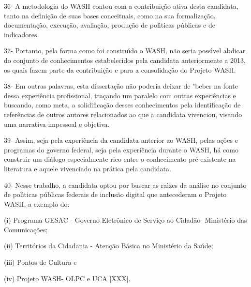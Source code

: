 \documentclass[
12pt,		%
openright,	%
twoside,  %
a4paper,			%
chapter=TITLE,		%
english,			%
french,				%
spanish,			%
brazil				%
]{USPSC-classe/USPSC}
\begin{document}
36- A metodologia do WASH contou com a contribui\c{c}\~ao ativa desta candidata, tanto na defini\c{c}\~ao de suas bases conceituais, como na sua formaliza\c{c}\~ao, documenta\c{c}\~ao, execu\c{c}\~ao,  avalia\c{c}\~ao, produ\c{c}\~ao de pol\'{\i}ticas p\'ublicas e de  indicadores.




37- Portanto, pela forma como foi constru\'{\i}do o WASH, n\~ao seria poss\'{\i}vel abdicar do conjunto de conhecimentos estabelecidos pela candidata anteriormente a 2013, os quais fazem parte da contribui\c{c}\~ao e  para a consolida\c{c}\~ao do Projeto WASH.  




38- Em outras palavras, esta disserta\c{c}\~ao n\~ao poderia deixar de "beber na fonte dessa experi\^encia profissional, tra\c{c}ando um paralelo com outras experi\^encias e buscando, como meta, a solidifica\c{c}\~ao desses conhecimentos pela identifica\c{c}\~ao de refer\^encias de outros autores relacionados ao que a candidata vivenciou, visando uma narrativa impessoal e objetiva.




39- Assim, seja pela experi\^encia da candidata anterior ao WASH, pelas a\c{c}\~oes e programas do governo federal,  seja pela experi\^encia durante o WASH, h\'a como construir um di\'alogo especialmente rico entre o conhecimento pr\'e-existente na literatura e aquele vivenciado na pr\'atica pela candidata.




40- Nesse trabalho, a candidata optou por buscar as ra\'{\i}zes da an\'alise no conjunto de pol\'{\i}ticas p\'ublicas federais  de inclus\~ao digital que antecederam o Projeto WASH, a exemplo do:





\begin{alineas}
\item (i) Programa GESAC - Governo Eletr\^onico de Servi\c{c}o ao Cidad\~ao- Minist\'erio das Comunica\c{c}\~oes;
\item (ii)  Territ\'orios da Cidadania - Aten\c{c}\~ao B\'asica no Minist\'erio da Sa\'ude;
\item (iii) Pontos de  Cultura e
\item (iv) Projeto WASH-  OLPC e UCA [XXX].
\end{alineas}
\end{document}
